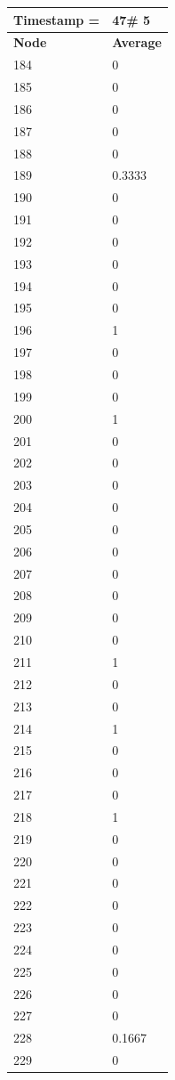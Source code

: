 \begin{tabular}{|l||l|}
\hline
\textbf{Timestamp =} & \textbf{47}\# 5\\\hline
	\textbf{Node} & \textbf{Average} \\ \hline
\hline
	184 & 0 \\ \hline
	185 & 0 \\ \hline
	186 & 0 \\ \hline
	187 & 0 \\ \hline
	188 & 0 \\ \hline
	189 & 0.3333 \\ \hline
	190 & 0 \\ \hline
	191 & 0 \\ \hline
	192 & 0 \\ \hline
	193 & 0 \\ \hline
	194 & 0 \\ \hline
	195 & 0 \\ \hline
	196 & 1 \\ \hline
	197 & 0 \\ \hline
	198 & 0 \\ \hline
	199 & 0 \\ \hline
	200 & 1 \\ \hline
	201 & 0 \\ \hline
	202 & 0 \\ \hline
	203 & 0 \\ \hline
	204 & 0 \\ \hline
	205 & 0 \\ \hline
	206 & 0 \\ \hline
	207 & 0 \\ \hline
	208 & 0 \\ \hline
	209 & 0 \\ \hline
	210 & 0 \\ \hline
	211 & 1 \\ \hline
	212 & 0 \\ \hline
	213 & 0 \\ \hline
	214 & 1 \\ \hline
	215 & 0 \\ \hline
	216 & 0 \\ \hline
	217 & 0 \\ \hline
	218 & 1 \\ \hline
	219 & 0 \\ \hline
	220 & 0 \\ \hline
	221 & 0 \\ \hline
	222 & 0 \\ \hline
	223 & 0 \\ \hline
	224 & 0 \\ \hline
	225 & 0 \\ \hline
	226 & 0 \\ \hline
	227 & 0 \\ \hline
	228 & 0.1667 \\ \hline
	229 & 0 \\ \hline
\end{tabular}
